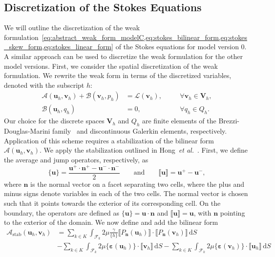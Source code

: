 \documentclass[fleqn]{wlscirep}
\newcommand{\intF}[1]{\int_{\mathcal{F}_k}#1 \, \mathrm dS}
\newcommand{\avg}[1]{\{#1\}}
\newcommand{\jump}[1]{\llbracket#1\rrbracket}
\newcommand{\nn}{\mathbf{n}}
\newcommand{\uu}{\mathbf{u}}
\newcommand{\vv}{\mathbf{v}}
\newcommand{\VV}{\mathbf{V}}
\newcommand{\beps}{\bm{\varepsilon}}
\begin{document}
\subsection{Discretization of the Stokes Equations}
We will outline the discretization of the weak formulation~\cref{eq:abstract_weak_form_modelC,eq:stokes_bilinear_form,eq:stokes_skew_form,eq:stokes_linear_form} of the Stokes equations for model version 0. A similar approach can be used to discretize the weak formulation for the other model versions. First, we consider the spatial discretization of the weak formulation. We rewrite the weak form in terms of the discretized variables, denoted with the subscript $h$:
\begin{subequations}
    \begin{alignat}{2}
        \mathcal{A}(\uu_h, \vv_h) + \mathcal{B}(\vv_h, p_h) &= \mathcal{L}(\vv_h), &&\quad\forall\vv_h\in\VV_h, \\
        \mathcal{B}(\uu_h, q_h) &= 0, &&\quad\forall q_h\in Q_h.
    \end{alignat}%
    \label{eq:no_stabilization_abstract_discrete_weak_form_modelC}%
\end{subequations}%
Our choice for the discrete spaces $\VV_h$ and $Q_h$ are finite elements of the Brezzi-Douglas-Marini family~\cite{Brezzi1985TwoProblems} and discontinuous Galerkin elements, respectively. Application of this scheme requires a stabilization of the bilinear form $\mathcal{A}(\uu_h, \vv_h)$. We apply the stabilization outlined in Hong~\emph{et al.}~\cite{Hong2016AEquations}. First, we define the average and jump operators, respectively, as
\begin{equation*}
    \avg{\uu} = \frac{\uu^+\cdot\nn^+ - \uu^-\cdot\nn^-}{2} \qquad\mathrm{and}\qquad \jump{\uu} = \uu^+ - \uu^-,
\end{equation*}
where $\nn$ is the normal vector on a facet separating two cells, where the plus and minus signs denote variables in each of the two cells. The normal vector is chosen such that it points towards the exterior of its corresponding cell. On the boundary, the operators are defined as $\avg{\uu} = \uu\cdot\nn$ and $\jump{\uu} = \uu$,
with $\nn$ pointing to the exterior of the domain. We now define and add the bilinear form
\begin{align*}
    \mathcal{A}_{\mathrm{stab}}(\uu_h, \vv_h) &= \sum_{k\in K}\intF{2\mu\frac{\gamma}{\avg{h}}\jump{P_{\nn}(\uu_h)}\cdot \jump{P_{\nn}(\vv_h)}}\\
    &-\sum_{k\in K}\intF{2\mu\avg{\beps(\uu_h)}\cdot\jump{\vv_h}}-\sum_{k\in K}\intF{2\mu\avg{\beps(\vv_h)}\cdot\jump{\uu_h}}
\end{align*}
\end{document}
